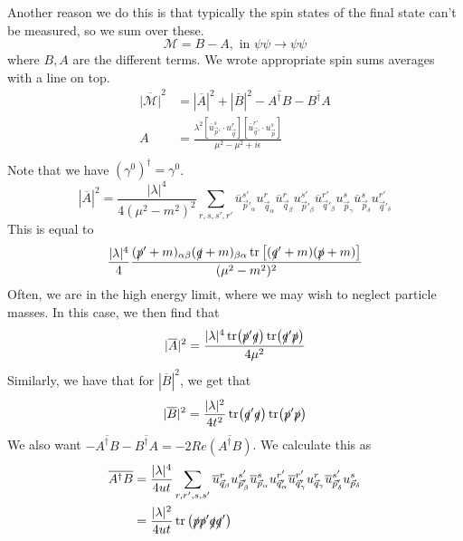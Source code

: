 Another reason we do this is that 
typically the spin states of the final state can't 
be measured, so we sum over these. 
\[
\mathcal{ M } = B - A , \text{ in } \psi \psi \to \psi \psi 
\] where $ B , A $ are the different terms. 
We wrote appropriate spin sums averages with a line on top. 
\begin{align*}
\overline{ | \mathcal{ M } | } ^ 2 &=  | \overline{ A } | ^ 2 
+ | \overline{ B } | ^ 2 - \overline{ A ^ \dagger B } - 
\overline{ B ^ \dagger A } \\
A &=  \frac{\lambda ^ 2 \left[  \overline{u  }_{ \vec{p} ' } ^ s 
\cdot  u_{ \vec{q} } ^ r  \right] \left[  
\overline{ u } _{ \vec{q} ' } ^{ r ' } \cdot  u_{ \vec{p} } ^ s \right]}{
\mu ^ 2- \mu ^ 2+ i \epsilon } \\
\end{align*}
Note that we have $ ( \gamma ^ 0 ) ^ \dagger  = \gamma ^ 0 $. 
\[
 | \overline{ A } | ^ 2 = \frac{ | \lambda | ^ 4  }{ 4 ( \mu ^ 2 - m ^ 2 ) ^ 2  } 
\sum_{ r , s , s' , r ' } \overline{u }_{ \vec{p} ' _ \alpha } ^{ s ' } 
u_{ \vec{q} _ \alpha } ^ r \overline{ u } _{ \vec{q} _ \beta } ^ r 
u_{ \vec{p} ' _ \beta } ^{ s ' } \overline{u }_{ \vec{q} ' _ \beta } ^{ r ' } 
u_{ \vec{p} _ \gamma } ^{ s } \overline{ u }_{ \vec{p} _ \delta } ^ s 
u_{ \vec{q}' _ \delta } ^{ r ' }
\]  This 
is equal to 
\[
\frac{ | \lambda |  ^ 4 }{ 4 } \frac{( \slashed{p}' + m)_{ \alpha \beta } 
( \slashed{q} + m )_{ \beta \alpha } \tr \left[  
( \slashed{q}' + m ) (\slashed{p} + m )  \right] }{ ( \mu ^ 2 - m ^ 2 ) ^  2}
\] Often, we are in the high energy limit, 
where we may wish to neglect particle masses. In this 
case, we then find that 
\[	| \overline{ A } | ^ 2 = \frac{ | \lambda | ^ 4 \tr ( 
\slashed{p} ' \slashed{q} ) \tr (\slashed{q} ' \slashed{p} ) }{4 \mu ^ 2 }
\] Similarly, we have that for $ | \overline{ B  } | ^ 2 $, 
we get that 
\[
| \overline{ B } | ^ 2 = \frac{  | \lambda | ^ 2 }{ 4 t ^ 2 }
\tr ( \slashed{q} ' \slashed{q} ) \tr ( \slashed{p} ' \slashed{p} ) 
\] We also want $  - \overline{ A ^ \dagger B  }  - \overline{ B ^ \dagger A }  = 
- 2 Re \overline{ ( A ^ \dagger B ) } $. 
We calculate this as 
\begin{align*}
\overline{ A ^ \dagger B  } &  = \frac{ | \lambda | ^ 4 }{ 4 u t} 
\sum_{ r , r' , s, s ' } \overline{u } _{ \vec{q} _ \beta } ^ r 
u _{ \vec{p} ' _ \beta }^{ s' } \overline{ u } _{ \vec{p} _ \alpha } ^ s 
u _{ \vec{q} ' _ \alpha } ^{ r '} \overline{ u } _{ \vec{q}' _ \gamma } ^{ r ' } 
u_{ \vec{q} _ \gamma } ^ r \overline{ u } _{ \vec{p} ' _ \delta } ^{ s' } 
u _{ \vec{p} _ \delta } ^ s \\
			    &=  \frac{|\lambda | ^ 2 }{ 4 ut } \tr \left(  
			    \slashed{p} \slashed{p} ' 
		    \slashed{q} \slashed{q}' \right)  \\
\end{align*} 

